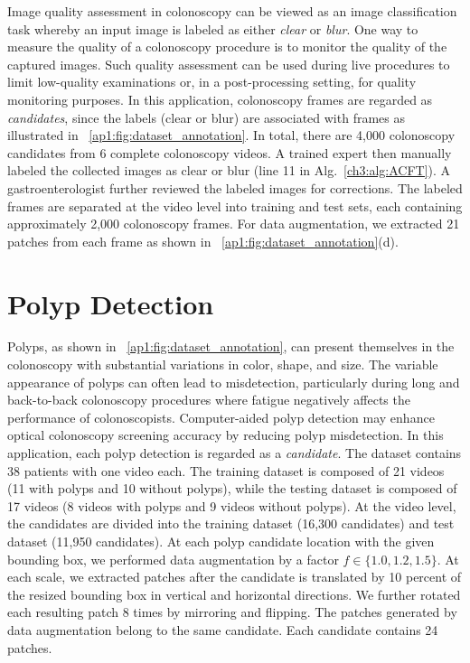Image quality assessment in colonoscopy can be viewed as an image classification task whereby an input image is labeled as either \textit{clear} or \textit{blur}. 
One way to measure the quality of a colonoscopy procedure is to monitor the quality of the captured images. Such quality assessment can be used during live procedures to limit low-quality examinations or, in a post-processing setting, for quality monitoring purposes.
In this application, colonoscopy frames are regarded as \textit{candidates}, since the labels (clear or blur) are associated with frames as illustrated in \figurename~\ref{ap1:fig:dataset_annotation}.  In total, there are 4,000 colonoscopy candidates from 6 complete colonoscopy videos. A trained expert then manually labeled the collected images as clear or blur (line 11 in Alg.~\ref{ch3:alg:ACFT}). A gastroenterologist further reviewed the labeled images for corrections. The labeled frames are separated at the video level into training and test sets, each containing approximately 2,000 colonoscopy frames. For data augmentation, we extracted 21 patches from each frame as shown in \figurename~\ref{ap1:fig:dataset_annotation}(d).


\section*{Polyp Detection}
\label{ap1:polyp_detection}

Polyps, as shown in \figurename~\ref{ap1:fig:dataset_annotation}, can present themselves in the colonoscopy with substantial variations in color, shape, and size. The variable appearance of polyps can often lead to misdetection, particularly during long and back-to-back colonoscopy procedures where fatigue negatively affects the performance of colonoscopists. Computer-aided polyp detection may enhance optical colonoscopy screening accuracy by reducing polyp misdetection. 
In this application, each polyp detection is regarded as a \textit{candidate}.
The dataset contains 38 patients with one video each. The training dataset is composed of 21 videos (11 with polyps and 10 without polyps), while the testing dataset is composed of 17 videos (8 videos with polyps and 9 videos without polyps). At the video level, the candidates are divided into the training dataset (16,300 candidates) and test dataset (11,950 candidates). At each polyp candidate location with the given bounding box, we performed data augmentation by a factor $f\in \{1.0,1.2,1.5\}$. At each scale, we extracted patches after the candidate is translated by 10 percent of the resized bounding box in vertical and horizontal directions. We further rotated each resulting patch 8 times by mirroring and flipping. The patches generated by data augmentation belong to the same candidate. Each candidate contains 24 patches.


